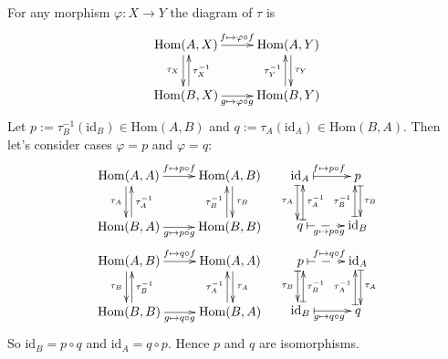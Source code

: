 \documentclass[12pt,a4paper]{article}
\newcommand{\id}{\mathrm{id}}
\newcommand{\Hom}{\mathrm{Hom}}
\begin{document}
    \begin{problem}{18}
        For any morphism $\varphi: X \to Y$ the diagram of $\tau$ is
        \[
            \xymatrix{
                \Hom(A, X) \ar[r]^{f \mapsto \varphi \circ f} \ar@{->}@<-.5ex>[d]_{\tau_X} & \Hom(A, Y) \ar@{->}@<.5ex>[d]^{\tau_Y} \\
                \Hom(B, X) \ar[r]_{g \mapsto \varphi \circ g} \ar@{->}@<-.5ex>[u]_{\tau_X^{-1}} & \Hom(B, Y) \ar@{->}@<.5ex>[u]^{\tau_Y^{-1}}
            }
        \]
        Let $p := \tau_B^{-1}(\id_B) \in \Hom(A, B)$ and $q := \tau_A(\id_A) \in \Hom(B, A)$. Then let's consider cases $\varphi = p$ and $\varphi = q$:
        \begin{align*}
            &\xymatrix{
                \Hom(A, A) \ar[r]^{f \mapsto p \circ f} \ar@{->}@<-.5ex>[d]_{\tau_A} & \Hom(A, B) \ar@{->}@<.5ex>[d]^{\tau_B} \\
                \Hom(B, A) \ar[r]_{g \mapsto p \circ g} \ar@{->}@<-.5ex>[u]_{\tau_A^{-1}} & \Hom(B, B) \ar@{->}@<.5ex>[u]^{\tau_B^{-1}}
            }&
            &\xymatrix{
                \id_A \ar@{|->}[r]^{f \mapsto p \circ f} \ar@{|->}@<-.5ex>[d]_{\tau_A} & p \ar@{|->}@<.5ex>[d]^{\tau_B} \\
                q \ar@{|-->}[r]_{g \mapsto p \circ g} \ar@{|->}@<-.5ex>[u]_{\tau_A^{-1}} & \id_B \ar@{|->}@<.5ex>[u]^{\tau_B^{-1}}
            }\\
            &\xymatrix{
                \Hom(A, B) \ar[r]^{f \mapsto q \circ f} \ar@{->}@<-.5ex>[d]_{\tau_B} & \Hom(A, A) \ar@{->}@<.5ex>[d]^{\tau_A} \\
                \Hom(B, B) \ar[r]_{g \mapsto q \circ g} \ar@{->}@<-.5ex>[u]_{\tau_B^{-1}} & \Hom(B, A) \ar@{->}@<.5ex>[u]^{\tau_A^{-1}}
            }&
            &\xymatrix{
                p \ar@{|-->}[r]^{f \mapsto q \circ f} \ar@{|->}@<-.5ex>[d]_{\tau_B} & \id_A \ar@{|->}@<.5ex>[d]^{\tau_A} \\
                \id_B \ar@{|->}[r]_{g \mapsto q \circ g} \ar@{|->}@<-.5ex>[u]_{\tau_B^{-1}} & q \ar@{|->}@<.5ex>[u]^{\tau_A^{-1}}
            }
        \end{align*}
        So $\id_B = p \circ q$ and $\id_A = q \circ p$. Hence $p$ and $q$ are isomorphisms.
    \end{problem}
\end{document}
